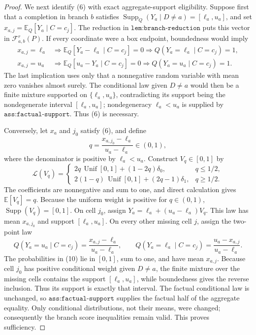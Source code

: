 \documentclass{article}
\begin{document}
\begin{proof}
We next identify (6) with exact aggregate-support eligibility.  Suppose first that a completion in branch \(b\) satisfies
\(\operatorname{Supp}_Q(Y_a\mid D\ne a)=[\ell_a,u_a]\), and set \(x_{a,j}=\mathbb E_Q[Y_a\mid C=c_j]\).  The reduction in \(\texttt{lem:branch-reduction}\) puts this vector in \(\mathcal F_{a,b}^r(P)\).  If every coordinate were a box endpoint, boundedness would imply
\[
 \begin{aligned}
 x_{a,j}=\ell_a
 &\Longrightarrow
 \mathbb E_Q[Y_a-\ell_a\mid C=c_j]=0
 \Longrightarrow Q(Y_a=\ell_a\mid C=c_j)=1,\\
 x_{a,j}=u_a
 &\Longrightarrow
 \mathbb E_Q[u_a-Y_a\mid C=c_j]=0
 \Longrightarrow Q(Y_a=u_a\mid C=c_j)=1.
 \end{aligned}                                                               \tag{7}
\]
The last implication uses only that a nonnegative random variable with mean zero vanishes almost surely.  The conditional law given \(D\ne a\) would then be a finite mixture supported on \(\{\ell_a,u_a\}\), contradicting its support being the nondegenerate interval \([\ell_a,u_a]\); nondegeneracy \(\ell_a<u_a\) is supplied by \(\texttt{ass:factual-support}\).  Thus (6) is necessary.

Conversely, let \(x_a\) and \(j_0\) satisfy (6), and define
\[
 q=\frac{x_{a,j_0}-\ell_a}{u_a-\ell_a}\in(0,1),                              \tag{8}
\]
where the denominator is positive by \(\ell_a<u_a\).  Construct \(V_q\in[0,1]\) by
\[
 \mathcal L(V_q)=
 \begin{cases}
 2q\,\operatorname{Unif}[0,1]+(1-2q)\delta_0,&q\le1/2,\\
 2(1-q)\,\operatorname{Unif}[0,1]+(2q-1)\delta_1,&q\ge1/2.
 \end{cases}                                                                  \tag{9}
\]
The coefficients are nonnegative and sum to one, and direct calculation gives \(\mathbb E[V_q]=q\).  Because the uniform weight is positive for \(q\in(0,1)\), \(\operatorname{Supp}(V_q)=[0,1]\).  On cell \(j_0\), assign
\(Y_a=\ell_a+(u_a-\ell_a)V_q\).  This law has mean \(x_{a,j_0}\) and support \([\ell_a,u_a]\).  On every other missing cell \(j\), assign the two-point law
\[
 Q(Y_a=u_a\mid C=c_j)=\frac{x_{a,j}-\ell_a}{u_a-\ell_a},
 \qquad
 Q(Y_a=\ell_a\mid C=c_j)=\frac{u_a-x_{a,j}}{u_a-\ell_a}.                    \tag{10}
\]
The probabilities in (10) lie in \([0,1]\), sum to one, and have mean \(x_{a,j}\).  Because cell \(j_0\) has positive conditional weight given \(D\ne a\), the finite mixture over the missing cells contains the support \([\ell_a,u_a]\), while boundedness gives the reverse inclusion.  Thus its support is exactly that interval.  The factual conditional law is unchanged, so \(\texttt{ass:factual-support}\) supplies the factual half of the aggregate equality.  Only conditional distributions, not their means, were changed; consequently the branch score inequalities remain valid.  This proves sufficiency.


\end{proof}
\end{document}
